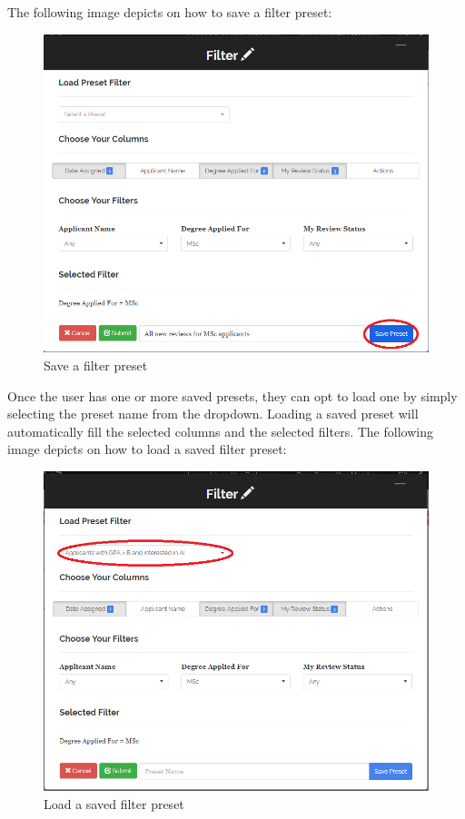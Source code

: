 \documentclass[fontsize=12pt,paper=letter,twoside]{scrartcl}
\begin{document}
\bigskip
\noindent The following image depicts on how to save a filter preset:
\begin{figure}[!htb]
\begin{center}
\includegraphics[width=.9\textwidth]{images/saving_preset.png}
\end{center}
\caption{Save a filter preset}
\label{fig:saving_preset}
\end{figure}

\newpage
\bigskip
\noindent Once the user has one or more saved presets, they can opt to load one by simply selecting the preset name from the dropdown. Loading a saved preset will automatically fill the selected columns and the selected filters. The following image depicts on how to load a saved filter preset:

\bigskip
\begin{figure}[!htb]
\begin{center}
\includegraphics[width=.9\textwidth]{images/load_preset.png}
\end{center}
\caption{Load a saved filter preset}
\label{fig:load_preset}
\end{figure}
\end{document}
